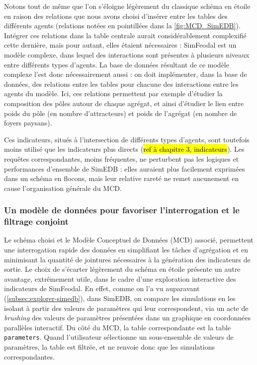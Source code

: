 Notons tout de même que l'on s'éloigne légèrement du classique schéma en étoile en raison des relations que nous avons choisi d'insérer entre les tables des différents agents (relations notées en pointillées dans la \cref{fig:MCD_SimEDB}).
Intégrer ces relations dans la table centrale aurait considérablement complexifié cette dernière, mais pour autant, elles étaient nécessaires : SimFeodal est un modèle complexe, dans lequel des interactions sont présentes à plusieurs niveaux entre différents types d'agents.
La base de données résultant de ce modèle complexe l'est donc nécessairement aussi : on doit implémenter, dans la base de données, des relations entre les  tables pour chacune des interactions entre les agents du modèle.
Ici, ces relations permettent par exemple d'étudier la composition des pôles autour de chaque agrégat, et ainsi d'étudier le lien entre poids du pôle (en nombre d'attracteurs) et poids de l'agrégat (en nombre de foyers paysans).

Ces indicateurs, situés à l'intersection de différents types d'agents, sont toutefois moins utilisé que les indicateurs plus directs (\hl{ref à chapitre 3, indicateurs}).
Les requêtes correspondantes, moins fréquentes, ne perturbent pas les logiques et performances d'ensemble de SimEDB : elles auraient plus facilement exprimées dans un schéma \og en flocons\fg{}, mais leur relative rareté ne remet aucunement en cause l'organisation générale du MCD.


\subsubsection{Un modèle de données pour favoriser l'interrogation et le filtrage conjoint}

Le schéma choisi et le Modèle Conceptuel de Données (MCD) associé, permettent  une interrogation rapide des données en simplifiant les tâches d'agrégation et en minimisant la quantité de jointures nécessaires à la génération des indicateurs de sortie.
Le choix de s'écarter légèrement du schéma en étoile présente un autre avantage, extrêmement utile, dans le cadre d'une exploration interactive des indicateurs de SimFeodal.
En effet, comme on l'a vu auparavant (\cref{subsec:explorer-simedb}), dans SimEDB, on compare les simulations en les isolant à partir des valeurs de paramètres qui leur correspondent, via un acte de \textit{brushing} des valeurs de paramètres présentées dans un graphique en coordonnées parallèles interactif.
Du côté du MCD, la table correspondante est la table \texttt{parameters}.
Quand l'utilisateur sélectionne un sous-ensemble de valeurs de paramètres, la table est filtrée, et ne renvoie donc que les simulations correspondantes.

